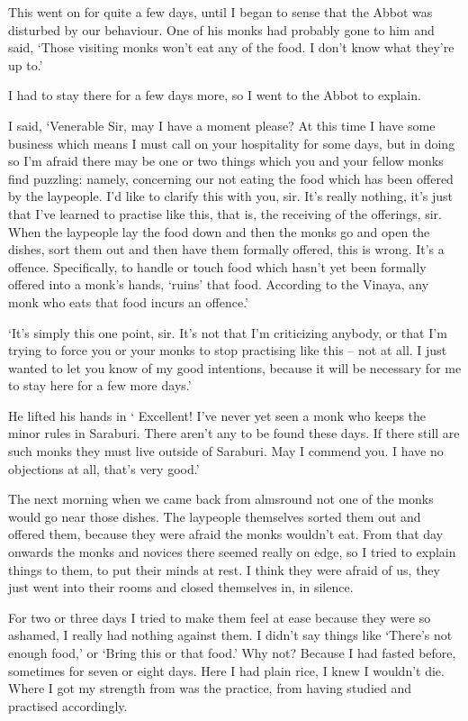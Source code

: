This went on for quite a few days, until I began to sense that the Abbot was disturbed by our behaviour. One of his monks had probably gone to him and said, `Those visiting monks won't eat any of the food. I don't know what they're up to.' 

I had to stay there for a few days more, so I went to the Abbot to explain. 

I said, `Venerable Sir, may I have a moment please? At this time I have some business which means I must call on your hospitality for some days, but in doing so I'm afraid there may be one or two things which you and your fellow monks find puzzling: namely, concerning our not eating the food which has been offered by the laypeople. I'd like to clarify this with you, sir. It's really nothing, it's just that I've learned to practise like this, that is, the receiving of the offerings, sir. When the laypeople lay the food down and then the monks go and open the dishes, sort them out and then have them formally offered, this is wrong. It's a  offence. Specifically, to handle or touch food which hasn't yet been formally offered into a monk's hands, `ruins' that food. According to the Vinaya, any monk who eats that food incurs an offence.'

`It's simply this one point, sir. It's not that I'm criticizing anybody, or that I'm trying to force you or your monks to stop practising like this -- not at all. I just wanted to let you know of my good intentions, because it will be necessary for me to stay here for a few more days.' 

He lifted his hands in  ` Excellent! I've never yet seen a monk who keeps the minor rules in Saraburi. There aren't any to be found these days. If there still are such monks they must live outside of Saraburi. May I commend you. I have no objections at all, that's very good.' 

The next morning when we came back from almsround not one of the monks would go near those dishes. The laypeople themselves sorted them out and offered them, because they were afraid the monks wouldn't eat. From that day onwards the monks and novices there seemed really on edge, so I tried to explain things to them, to put their minds at rest. I think they were afraid of us, they just went into their rooms and closed themselves in, in silence. 

For two or three days I tried to make them feel at ease because they were so ashamed, I really had nothing against them. I didn't say things like `There's not enough food,' or `Bring this or that food.' Why not? Because I had fasted before, sometimes for seven or eight days. Here I had plain rice, I knew I wouldn't die. Where I got my strength from was the practice, from having studied and practised accordingly. 

